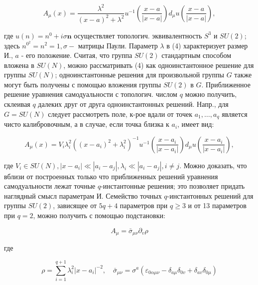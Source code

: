 \documentclass[10pt]{article}
\begin{document}
\[

A_{\mu}(x)=\frac{\lambda^{2}}{(x-a)^{2}+\lambda^{2}} u^{-1}\left(\frac{x-a}{|x-a|}\right) d_{\mu} u\left(\frac{x-a}{|x-a|}\right),

\]



где $u(n)=n^{0}+i \sigma \boldsymbol{n}$ осуществляет топологич. эквивалентность $S^{3}$ и $S U(2)$; здесь $n^{0^{2}}=n^{2}=1, \sigma-$ матрицы Паули. Параметр $\lambda$ в (4) характеризует размер И., $a$ - его положение. Считая, что группа $S U(2)$ стандартным способом вложена в $S U(N)$, можно рассматривать (4) как одноинстантонное решение для группы $S U(N)$; одноинстантонные решения для произвольной группы $G$ также могут быть получены с помощью вложения группы $S U(2)$ в $G$. Приближенное решение уравнения самодуальности с топологич. числом $q$ можно получить, склеивая $q$ далеких друг от друга одноинстантонных решений. Напр., для $G=S U(N)$ следует рассмотреть поле, к-рое вдали от точек $a_{1}, \ldots, a_{q}$ является чисто калибровочным, а в случае, если точка близка к $a_{i}$, имеет вид:



\[

A_{\mu}(x)=V_{i} \lambda_{i}^{2}\left(\left(x-a_{i}\right)^{2}+\lambda_{i}^{2}\right)^{-1} u^{-1}\left(\frac{x-a_{i}}{\left|x-a_{i}\right|}\right) d_{\mu} u\left(\frac{x-a_{i}}{\left|x-a_{i}\right|}\right),

\]



где $V_{i} \in S U(N),\left|x-a_{i}\right| \ll\left|a_{i}-a_{j}\right|, \lambda_{i} \ll\left|a_{i}-a_{j}\right|, i \neq j$. Можно доказать, что вблизи от построенных только что приближенных решений уравнения самодуальности лежат точные $q$-инстантонные решения; это позволяет придать наглядный смысл параметрам И. Семейство точных $q$-инстантонных решений для группы $S U(2)$, зависящее от $5 q+4$ параметров при $q \geqslant 3$ и от 13 параметров при $q=2$, можно получить с помощью подстановки:



\[

A_{\mu}=\bar{\sigma}_{\mu \nu} \partial_{v} \rho

\]



где



\[

\rho=\sum_{i=1}^{q+1} \lambda_{i}^{2}\left|x-a_{i}\right|^{-2}, \quad \bar{\sigma}_{\mu \nu}=\sigma^{a}\left(\varepsilon_{0 \alpha \mu \nu}-\delta_{a \mu} \delta_{0 v}+\delta_{a v} \delta_{0 \mu}\right)

\]
\end{document}
